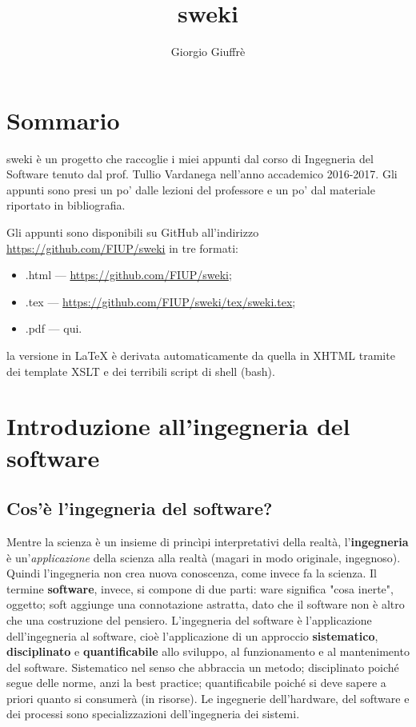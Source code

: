 \documentclass[a4paper]{article}
\title{sweki}
\author{Giorgio Giuffrè}
\date{}
\begin{document}
\maketitle
\tableofcontents
\newpage


\section{Sommario}
sweki è un progetto che raccoglie i miei appunti dal corso di Ingegneria del Software tenuto dal prof. Tullio Vardanega nell'anno accademico 2016-2017. Gli appunti sono presi un po' dalle lezioni del professore e un po' dal materiale riportato in bibliografia.

Gli appunti sono disponibili su GitHub all'indirizzo \url{https://github.com/FIUP/sweki} in tre formati:
\begin{itemize}
	\item .html --- \url{https://github.com/FIUP/sweki};
	\item .tex --- \url{https://github.com/FIUP/sweki/tex/sweki.tex};
	\item .pdf --- qui.
\end{itemize}

la versione in \LaTeX{} è derivata automaticamente da quella in XHTML tramite dei template XSLT e dei terribili script di shell (bash).



		
	\section{Introduzione all'ingegneria del software}


		
	\subsection{Cos'è l'ingegneria del software?}

		
Mentre la scienza è un insieme di princìpi interpretativi della realtà, l'\textbf{ingegneria} è un'\emph{applicazione} della scienza alla realtà (magari in modo originale, ingegnoso). Quindi l'ingegneria non crea nuova conoscenza, come invece fa la scienza. Il termine \textbf{software}, invece, si compone di due parti: ware significa "cosa inerte", oggetto; soft aggiunge una connotazione astratta, dato che il software non è altro che una costruzione del pensiero. L'ingegneria del software è l'applicazione dell'ingegneria al software, cioè l'applicazione di un approccio \textbf{sistematico}, \textbf{disciplinato} e \textbf{quantificabile} allo sviluppo, al funzionamento e al mantenimento del software. Sistematico nel senso che abbraccia un metodo; disciplinato poiché segue delle norme, anzi la best practice; quantificabile poiché si deve sapere a priori quanto si consumerà (in risorse). Le ingegnerie dell'hardware, del software e dei processi sono specializzazioni dell'ingegneria dei sistemi.
\end{document}
